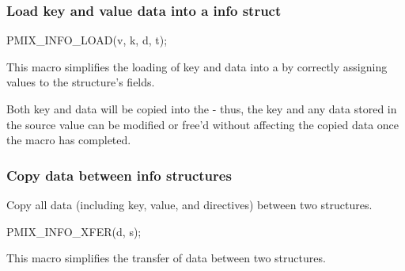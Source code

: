 \subsubsection{Load key and value data into a info struct}

\cspecificstart
\begin{codepar}
PMIX_INFO_LOAD(v, k, d, t);
\end{codepar}
\cspecificend

\begin{arglist}
\end{arglist}

This macro simplifies the loading of key and data into a  by correctly assigning values to the structure's fields.

\adviceuserstart
Both key and data will be copied into the  - thus, the key and any data stored in the source value can be modified or free'd without affecting the copied data once the macro has completed.
\adviceuserend

\subsubsection{Copy data between info structures}

Copy all data (including key, value, and directives) between two  structures.

\cspecificstart
\begin{codepar}
PMIX_INFO_XFER(d, s);
\end{codepar}
\cspecificend

\begin{arglist}
\end{arglist}

This macro simplifies the transfer of data between two structures.

